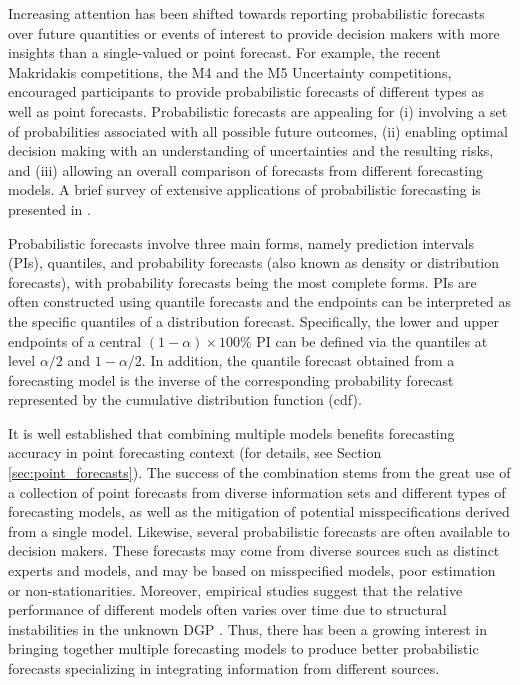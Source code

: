 \documentclass[11pt]{article}
\begin{document}
Increasing attention has been shifted towards reporting probabilistic forecasts over future quantities or events of interest to provide decision makers with more insights than a single-valued or point forecast. For example, the recent Makridakis competitions, the M4 and the M5 Uncertainty \citep{Makridakis2020-lz} competitions, encouraged participants to provide probabilistic forecasts of different types as well as point forecasts. Probabilistic forecasts are appealing for (i) involving a set of probabilities associated with all possible future outcomes, (ii) enabling optimal decision making with an understanding of uncertainties and the resulting risks, and (iii) allowing an overall comparison of forecasts from different forecasting models. A brief survey of extensive applications of probabilistic forecasting is presented in \cite{Gneiting2014-tz}.

Probabilistic forecasts involve three main forms, namely prediction intervals (PIs), quantiles, and probability forecasts (also known as density or distribution forecasts), with probability forecasts being the most complete forms. PIs are often constructed using quantile forecasts and the endpoints can be interpreted as the specific quantiles of a distribution forecast. Specifically, the lower and upper endpoints of a central $(1-\alpha)\times 100\%$ PI can be defined via the quantiles at level $\alpha/2$ and $1-\alpha/2$. In addition, the quantile forecast obtained from a forecasting model is the inverse of the corresponding probability forecast represented by the cumulative distribution function (cdf).

It is well established that combining multiple models benefits forecasting accuracy in point forecasting context (for details, see Section \ref{sec:point_forecasts}). The success of the combination stems from the great use of a collection of point forecasts from diverse information sets and different types of forecasting models, as well as the mitigation of potential misspecifications derived from a single model. Likewise, several probabilistic forecasts are often available to decision makers. These forecasts may come from diverse sources such as distinct experts and models, and may be based on misspecified models, poor estimation or non-stationarities. Moreover, empirical studies suggest that the relative performance of different models often varies over time due to structural instabilities in the unknown DGP \citep[e.g.,][]{Billio2013-sg}. Thus, there has been a growing interest in bringing together multiple forecasting models to produce better probabilistic forecasts specializing in integrating information from different sources.
\end{document}
